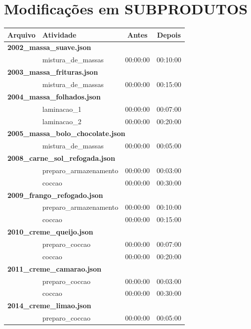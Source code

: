\documentclass[12pt,a4paper]{article}
\begin{document}
\section{Modificações em SUBPRODUTOS}

\begin{longtable}{p{4.5cm}p{5.5cm}cc}
\toprule
\textbf{Arquivo} & \textbf{Atividade} & \textbf{Antes} & \textbf{Depois} \\
\midrule
\endhead

\multicolumn{4}{l}{\textbf{2002\_massa\_suave.json}} \\
& mistura\_de\_massas & 00:00:00 & 00:10:00 \\
\midrule

\multicolumn{4}{l}{\textbf{2003\_massa\_frituras.json}} \\
& mistura\_de\_massas & 00:00:00 & 00:15:00 \\
\midrule

\multicolumn{4}{l}{\textbf{2004\_massa\_folhados.json}} \\
& laminacao\_1 & 00:00:00 & 00:07:00 \\
& laminacao\_2 & 00:00:00 & 00:20:00 \\
\midrule

\multicolumn{4}{l}{\textbf{2005\_massa\_bolo\_chocolate.json}} \\
& mistura\_de\_massas & 00:00:00 & 00:05:00 \\
\midrule

\multicolumn{4}{l}{\textbf{2008\_carne\_sol\_refogada.json}} \\
& preparo\_armazenamento & 00:00:00 & 00:03:00 \\
& coccao & 00:00:00 & 00:30:00 \\
\midrule

\multicolumn{4}{l}{\textbf{2009\_frango\_refogado.json}} \\
& preparo\_armazenamento & 00:00:00 & 00:10:00 \\
& coccao & 00:00:00 & 00:15:00 \\
\midrule

\multicolumn{4}{l}{\textbf{2010\_creme\_queijo.json}} \\
& preparo\_coccao & 00:00:00 & 00:07:00 \\
& coccao & 00:00:00 & 00:20:00 \\
\midrule

\multicolumn{4}{l}{\textbf{2011\_creme\_camarao.json}} \\
& preparo\_coccao & 00:00:00 & 00:03:00 \\
& coccao & 00:00:00 & 00:30:00 \\
\midrule

\multicolumn{4}{l}{\textbf{2014\_creme\_limao.json}} \\
& preparo\_coccao & 00:00:00 & 00:05:00 \\

\bottomrule
\end{longtable}
\end{document}
